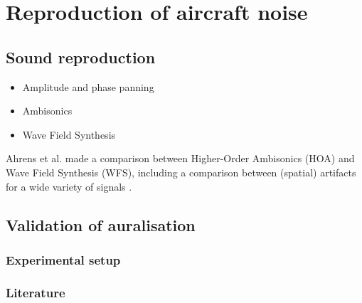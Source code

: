 \part{Reproduction of aircraft noise}



\chapter{Sound reproduction}

\begin{itemize}
 \item Amplitude and phase panning
 \item Ambisonics
 \item Wave Field Synthesis
\end{itemize}





Ahrens et al. made a comparison between Higher-Order Ambisonics (HOA) and Wave Field Synthesis (WFS), including a comparison between (spatial) artifacts for a wide variety of signals \cite{Ahrens2010}.







\chapter{Validation of auralisation}

\section{Experimental setup}

\section{Literature}



